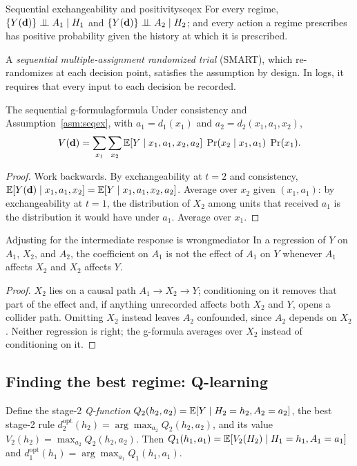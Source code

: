 \documentclass[11pt]{article}
\begin{document}
\begin{assum}{Sequential exchangeability and positivity}{seqex}
For every regime, $\{Y(\mathbf d)\} \perp\!\!\!\perp A_1 \mid H_1$ and $\{Y(\mathbf d)\} \perp\!\!\!\perp A_2 \mid H_2$; and every action a regime prescribes
has positive probability given the history at which it is prescribed.
\end{assum}

A \emph{sequential multiple-assignment randomized trial} (SMART), which re-randomizes at each decision point, satisfies the
assumption by design. In logs, it requires that every input to each decision be recorded.

\begin{prop}{The sequential g-formula}{gformula}
Under consistency and Assumption~\ref{asm:seqex}, with $a_1 = d_1(x_1)$ and $a_2 = d_2(x_1, a_1, x_2)$,
\[
  V(\mathbf d) = \sum_{x_1}\sum_{x_2} \mathbb{E}[Y \mid x_1, a_1, x_2, a_2]\;\Pr(x_2 \mid x_1, a_1)\;\Pr(x_1).
\]
\end{prop}
\begin{proof}
Work backwards. By exchangeability at $t = 2$ and consistency,
$\mathbb{E}[Y(\mathbf d) \mid x_1, a_1, x_2] = \mathbb{E}[Y \mid x_1, a_1, x_2, a_2]$. Average over $x_2$ given $(x_1, a_1)$: by exchangeability at
$t = 1$, the distribution of $X_2$ among units that received $a_1$ is the distribution it would have under $a_1$. Average
over $x_1$.
\end{proof}

\begin{prop}{Adjusting for the intermediate response is wrong}{mediator}
In a regression of $Y$ on $A_1$, $X_2$, and $A_2$, the coefficient on $A_1$ is not the effect of $A_1$ on $Y$ whenever $A_1$
affects $X_2$ and $X_2$ affects $Y$.
\end{prop}
\begin{proof}
$X_2$ lies on a causal path $A_1 \to X_2 \to Y$; conditioning on it removes that part of the effect and, if
anything unrecorded affects both $X_2$ and $Y$, opens a collider path. Omitting $X_2$ instead leaves $A_2$ confounded,
since $A_2$ depends on $X_2$. Neither regression is right; the g-formula averages over $X_2$ instead of conditioning on it.
\end{proof}

\subsection{Finding the best regime: Q-learning}

Define the stage-2 \emph{Q-function} $Q_2(h_2, a_2) = \mathbb{E}[Y \mid H_2 = h_2, A_2 = a_2]$, the best stage-2 rule
$d_2^{\text{opt}}(h_2) = \arg\max_{a_2} Q_2(h_2, a_2)$, and its value $V_2(h_2) = \max_{a_2} Q_2(h_2, a_2)$. Then
$Q_1(h_1, a_1) = \mathbb{E}[V_2(H_2) \mid H_1 = h_1, A_1 = a_1]$ and $d_1^{\text{opt}}(h_1) = \arg\max_{a_1} Q_1(h_1, a_1)$.
\end{document}
